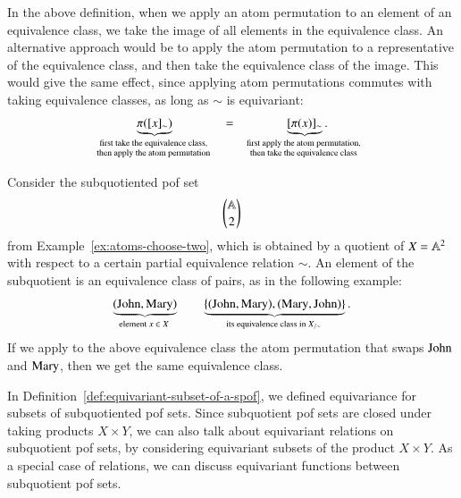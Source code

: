 In the above definition, when we apply an atom permutation to an element of an equivalence class, we take the image of all elements in the equivalence class. An alternative approach would be to apply the atom permutation to a representative of the equivalence class, and then take the equivalence class of the image. This would give the same effect, since applying atom permutations commutes with taking equivalence classes, as long as $\sim$ is equivariant:
    \begin{align*}
    \myunderbrace{\pi([x]_\sim)}{first take the equivalence class, \\ then apply the atom permutation}
    \qquad \qquad  = \qquad \qquad
    \myunderbrace{[\pi(x)]_\sim}{first apply the atom permutation, \\ then take the equivalence class}.
    \end{align*}


\begin{myexample}
    Consider the subquotiented pof set
\begin{align*}
\mathbb A \choose 2
\end{align*}
from Example~\ref{ex:atoms-choose-two}, which is obtained by a quotient of $X = \mathbb A^2$ with respect to a certain partial equivalence relation $\sim$.  An element  of the subquotient is  an equivalence class of  pairs, as in the following example: 
\begin{align}\label{eq:subquotiented-element-example}
   \myunderbrace{(\john,\mary)}{element $x \in X$} 
   \qquad 
   \myunderbrace{\set{(\john,\mary),(\mary,\john)}}{its equivalence class in $X_{/\sim}$}.
\end{align}
If we apply to the above equivalence class the atom permutation that swaps $\text{John}$ and $\text{Mary}$, then we get the same equivalence class. 
\end{myexample}

In Definition~\ref{def:equivariant-subset-of-a-spof}, we defined equivariance for subsets of subquotiented pof sets. Since subquotient pof sets are closed under taking products $X \times Y$, we can also talk about equivariant relations on subquotient pof sets, by considering equivariant subsets of the product $X \times Y$. As a special case of relations, we can discuss equivariant functions between subquotient pof sets.

